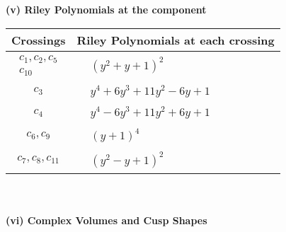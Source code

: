 \documentclass[1p]{elsarticle_modified}
\theoremstyle{definition}
\begin{document}
\newpage\renewcommand{\arraystretch}{1}
\flushleft \textbf{(v) Riley Polynomials at the component}\newline \\
\begin{tabular}{m{50pt}|m{274pt}}
Crossings & \hspace{64pt}Riley Polynomials at each crossing \\
\hline $$\begin{aligned}c_{1},c_{2},c_{5}\\c_{10}\end{aligned}$$&$\begin{aligned}
&(y^2+y+1)^2
\end{aligned}$\\
\hline $$\begin{aligned}c_{3}\end{aligned}$$&$\begin{aligned}
&y^4+6 y^3+11 y^2-6 y+1
\end{aligned}$\\
\hline $$\begin{aligned}c_{4}\end{aligned}$$&$\begin{aligned}
&y^4-6 y^3+11 y^2+6 y+1
\end{aligned}$\\
\hline $$\begin{aligned}c_{6},c_{9}\end{aligned}$$&$\begin{aligned}
&(y+1)^4
\end{aligned}$\\
\hline $$\begin{aligned}c_{7},c_{8},c_{11}\end{aligned}$$&$\begin{aligned}
&(y^2- y+1)^2
\end{aligned}$\\
\hline
\end{tabular}\\~\\
\newpage\flushleft \textbf{(vi) Complex Volumes and Cusp Shapes}
\end{document}
